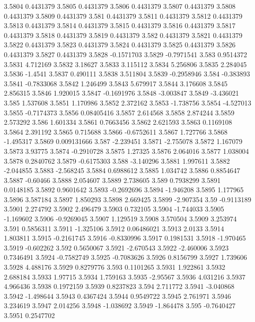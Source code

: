 3.5804  0.4431379
3.5805  0.4431379
3.5806  0.4431379
3.5807  0.4431379
3.5808  0.4431379
3.5809  0.4431379
3.581  0.4431379
3.5811  0.4431379
3.5812  0.4431379
3.5813  0.4431379
3.5814  0.4431379
3.5815  0.4431379
3.5816  0.4431379
3.5817  0.4431379
3.5818  0.4431379
3.5819  0.4431379
3.582  0.4431379
3.5821  0.4431379
3.5822  0.4431379
3.5823  0.4431379
3.5824  0.4431379
3.5825  0.4431379
3.5826  0.4431379
3.5827  0.4431379
3.5828  -0.1571703
3.5829  -0.7971541
3.583  0.9514372
3.5831  4.712169
3.5832  3.18627
3.5833  3.115112
3.5834  5.256806
3.5835  2.284045
3.5836  -1.4541
3.5837  0.490111
3.5838  3.511804
3.5839  -0.2958946
3.584  -0.383893
3.5841  -0.7833068
3.5842  1.246499
3.5843  5.679917
3.5844  3.176608
3.5845  2.856315
3.5846  1.920015
3.5847  -0.1691976
3.5848  -3.003847
3.5849  -3.436021
3.585  1.537608
3.5851  1.170986
3.5852  2.372162
3.5853  -1.738756
3.5854  -4.527013
3.5855  -0.7174373
3.5856  0.08405416
3.5857  2.614568
3.5858  2.874244
3.5859  2.573292
3.586  1.601334
3.5861  0.7663456
3.5862  2.621593
3.5863  0.1169108
3.5864  2.391192
3.5865  0.715688
3.5866  -0.6752611
3.5867  1.727766
3.5868  -1.495317
3.5869  0.009131666
3.587  -2.239451
3.5871  -2.755078
3.5872  1.167079
3.5873  3.93775
3.5874  -0.2910728
3.5875  1.27325
3.5876  2.064016
3.5877  1.038004
3.5878  0.2840762
3.5879  -0.6175303
3.588  -3.140296
3.5881  1.997611
3.5882  -2.044855
3.5883  -2.568245
3.5884  0.6988612
3.5885  1.034742
3.5886  0.8854647
3.5887  -0.60466
3.5888  2.054607
3.5889  2.738605
3.589  0.7938299
3.5891  0.0148185
3.5892  0.9601642
3.5893  -0.2692696
3.5894  -1.946208
3.5895  1.177965
3.5896  3.587184
3.5897  1.850293
3.5898  2.669425
3.5899  -2.907354
3.59  -0.9113189
3.5901  2.274792
3.5902  2.496479
3.5903  0.732105
3.5904  -1.744033
3.5905  -1.169602
3.5906  -0.9269045
3.5907  1.129519
3.5908  3.570504
3.5909  3.253974
3.591  0.5856311
3.5911  -1.325106
3.5912  0.06486021
3.5913  2.0133
3.5914  1.803811
3.5915  -0.2161745
3.5916  -0.8330996
3.5917  0.1981531
3.5918  -1.970465
3.5919  -0.602262
3.592  0.5650067
3.5921  -2.670543
3.5922  -2.460006
3.5923  0.7346491
3.5924  -0.7582749
3.5925  -0.7083626
3.5926  0.8156799
3.5927  1.739606
3.5928  4.488176
3.5929  0.8279776
3.593  0.1101265
3.5931  1.922861
3.5932  2.688184
3.5933  1.97715
3.5934  1.759163
3.5935  -2.95567
3.5936  4.031216
3.5937  4.966436
3.5938  0.1972159
3.5939  0.8237823
3.594  2.711772
3.5941  -3.040868
3.5942  -1.498644
3.5943  0.4367424
3.5944  0.9549722
3.5945  2.761971
3.5946  3.234619
3.5947  2.014256
3.5948  -1.038692
3.5949  -1.864478
3.595  -0.7640427
3.5951  0.2547702
